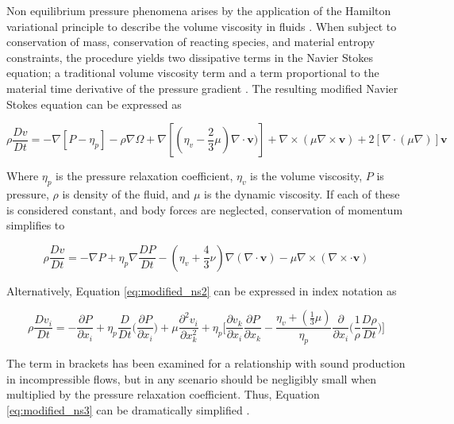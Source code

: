 Non equilibrium pressure phenomena arises by the application of the 
Hamilton variational principle to describe the volume viscosity in fluids 
\cite{zuckerwar2006}. When subject to conservation of mass, conservation of 
reacting species, and material entropy constraints, the procedure yields two 
dissipative terms in the Navier Stokes equation; a traditional volume viscosity 
term and a term proportional to the material time derivative of the pressure 
gradient \cite{zuckerwar2009}. The resulting modified Navier Stokes equation 
can be expressed as

\begin{equation}
\rho \frac{Dv}{Dt} = - \nabla[P - \eta_p] -
\rho \nabla \Omega + 
\nabla[(\eta_v - \frac{2}{3} \mu)\nabla \cdot \pmb{\text{v}})] + 
\nabla \times (\mu \nabla \times \pmb{\text{v}}) + 
2[\nabla \cdot (\mu \nabla)] \pmb{\text{v}}
\label{eq:modified_ns1}
\end{equation}

\noindent
Where $\eta_p$ is the pressure relaxation coefficient, $\eta_v$ is the volume 
viscosity, $P$ is pressure, $\rho$ is density of the fluid, and $\mu$ is the 
dynamic viscosity. If each of these is considered constant, and body forces are 
neglected, conservation of momentum simplifies to 

\begin{equation}
\rho \frac{Dv}{Dt} = - \nabla P + \eta_p \nabla \frac{DP}{Dt} - 
(\eta_v + \frac{4}{3}\nu) \nabla (\nabla \cdot\pmb{\text{v}})
- \mu \nabla \times (\nabla \times \cdot\pmb{\text{v}})
\label{eq:modified_ns2}
\end{equation}

\noindent
Alternatively, Equation \ref{eq:modified_ns2} can be expressed in index 
notation as 

\begin{equation}
\rho \frac{Dv_i}{Dt} = -\frac{\partial P}{\partial x_i} +
\eta_p \frac{D}{Dt} \Bigg( \frac{\partial P}{\partial x_i} \Bigg) + 
\mu \frac{\partial^2 v_i}{\partial x_{k}^2} + 
\eta_p \Bigg[\frac{\partial v_k}{\partial x_i} \frac{\partial P}{\partial x_k} -
\frac{\eta_v + (\frac{1}{3}\mu)}{\eta_p} \frac{\partial}{\partial 
x_i} \Bigg( \frac{1}{\rho} \frac{D\rho}{Dt} \Bigg) \Bigg]
\label{eq:modified_ns3}
\end{equation}

The term in brackets has been examined for a relationship with sound production 
in incompressible flows, but in any scenario should be negligibly small when 
multiplied by the pressure relaxation coefficient. Thus, Equation 
\ref{eq:modified_ns3} can be dramatically simplified \cite{ash2011}.

